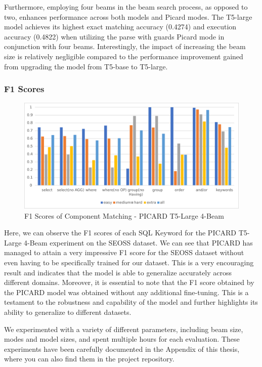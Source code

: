 Furthermore, employing four beams in the beam search process, as opposed to two, enhances performance across both models and Picard modes. The T5-large model achieves its highest exact matching accuracy (0.4274) and execution accuracy (0.4822) when utilizing the parse with guards Picard mode in conjunction with four beams. Interestingly, the impact of increasing the beam size is relatively negligible compared to the performance improvement gained from upgrading the model from T5-base to T5-large.

\subsubsection*{F1 Scores}

\begin{figure}[H]
    \centering
    \includegraphics[width=1\textwidth]{pics/ez/F1eps}
    \caption{F1 Scores of Component Matching - PICARD T5-Large 4-Beam}
\end{figure}

Here, we can observe the F1 scores of each SQL Keyword for the PICARD T5-Large 4-Beam experiment on the SEOSS dataset. We can see that PICARD has managed to attain a very impressive F1 score for the SEOSS dataset without even having to be specifically trained for our dataset. This is a very encouraging result and indicates that the model is able to generalize accurately across different domains. Moreover, it is essential to note that the F1 score obtained by the PICARD model was obtained without any additional fine-tuning. This is a testament to the robustness and capability of the model and further highlights its ability to generalize to different datasets.

We experimented with a variety of different parameters, including beam size, modes and model sizes, and spent multiple hours for each evaluation. These experiments have been carefully documented in the Appendix of this thesis, where you can also find them in the project repository.
